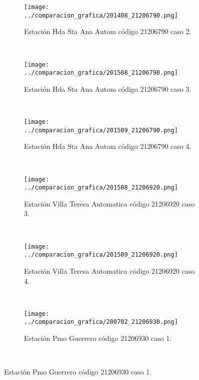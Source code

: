 \begin{figure}[H]\ContinuedFloat
\centering
\begin{subfigure}[normla]{0.4\textwidth}
\caption{Estación Hda Sta Ana Autom código 21206790 caso 2.}
\texttt{[image: ../comparacion\_grafica/201408\_21206790.png]}
\end{subfigure}
~
\begin{subfigure}[normla]{0.4\textwidth}
\caption{Estación Hda Sta Ana Autom código 21206790 caso 3.}
\texttt{[image: ../comparacion\_grafica/201508\_21206790.png]}
\end{subfigure}
~
\begin{subfigure}[normla]{0.4\textwidth}
\caption{Estación Hda Sta Ana Autom código 21206790 caso 4.}
\texttt{[image: ../comparacion\_grafica/201509\_21206790.png]}
\end{subfigure}
~
\begin{subfigure}[normla]{0.4\textwidth}
\caption{Estación Villa Teresa Automatica código 21206920 caso 3.}
\texttt{[image: ../comparacion\_grafica/201508\_21206920.png]}
\end{subfigure}
~
\begin{subfigure}[normla]{0.4\textwidth}
\caption{Estación Villa Teresa Automatica código 21206920 caso 4.}
\texttt{[image: ../comparacion\_grafica/201509\_21206920.png]}
\end{subfigure}
~
\begin{subfigure}[normla]{0.4\textwidth}
\caption{Estación Pmo Guerrero código 21206930 caso 1.}
\texttt{[image: ../comparacion\_grafica/200702\_21206930.png]}
\end{subfigure}
~
\end{figure}
           
